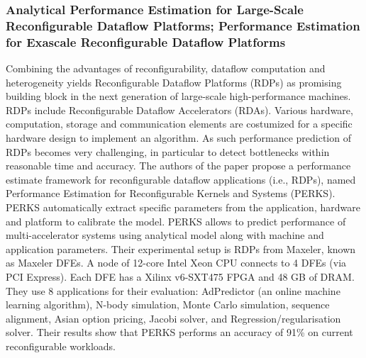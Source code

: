 \subsubsection{Analytical Performance Estimation for Large-Scale Reconfigurable Dataflow Platforms; Performance Estimation for Exascale Reconfigurable Dataflow Platforms}
Combining the advantages of reconfigurability, dataflow computation and heterogeneity yields Reconfigurable Dataflow Platforms (RDPs) as promising building block in the next generation of large-scale high-performance machines. RDPs include Reconfigurable Dataflow Accelerators (RDAs). Various hardware, computation, storage and communication elements are costumized for a specific hardware design to implement an algorithm. As such performance prediction of RDPs becomes very challenging, in particular to detect bottlenecks within reasonable time and accuracy. The authors of the paper propose a performance estimate framework for reconfigurable dataflow applications (i.e., RDPs), named Performance Estimation for Reconfigurable Kernels and Systems (PERKS). PERKS automatically extract specific parameters from the application, hardware and platform to calibrate the model. PERKS allows to predict performance of multi-accelerator systems using analytical model along with machine and application parameters. Their experimental setup is RDPs from Maxeler, known as Maxeler DFEs. A node of 12-core Intel Xeon CPU connects to 4 DFEs (via PCI Express). Each DFE has a Xilinx v6-SXT475 FPGA and 48 GB of DRAM. They use 8 applications for their evaluation: AdPredictor (an online machine learning algorithm), N-body simulation, Monte Carlo simulation, sequence alignment, Asian option pricing, Jacobi solver, and Regression/regularisation solver. Their results show that PERKS performs an accuracy of 91\% on current reconfigurable workloads.
\fi



 


